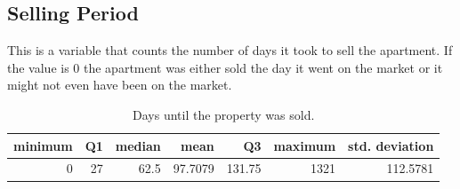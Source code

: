\subsection*{Selling Period}
This is a variable that counts the number of days it took to sell the apartment.
If the value is 0 the apartment was either sold the day it went on the market or it might not even have been on the market.
\begin{table}[H]
    \centering
    \begin{tabular}{rrrrrrr}
        \toprule
        \textbf{minimum} & \textbf{Q1} & \textbf{median} & \textbf{mean} & \textbf{Q3} & \textbf{maximum} & \textbf{std. deviation}\\
        \midrule
        0 & 27 & 62.5 & 97.7079 & 131.75 & 1321 & 112.5781\\
        \bottomrule
    \end{tabular}
    \caption{Days until the property was sold.}
    \label{tbl:days_until_sold}
\end{table}

